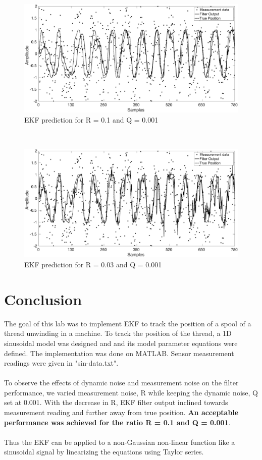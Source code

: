\documentclass[12pt]{article}
\begin{document}
\begin{figure}[ht!]
\centering
	\includegraphics[width = \textwidth]{./Figures/ratio2.eps}
	\caption{EKF prediction for R = 0.1 and Q = 0.001}
	\label{fig:EKF rat2}
\end{figure} 
\quad \\
\begin{figure}[hb!]
\centering
	\includegraphics[width = \textwidth]{./Figures/ratio3.eps}
	\caption{EKF prediction for R = 0.03 and Q = 0.001}
	\label{fig:EKF rat3}
\end{figure} \newpage

\newpage
\section{Conclusion}
The goal of this lab was to implement EKF to track the position of a spool of a thread unwinding in a machine. To track the position of the thread, a 1D sinusoidal model was designed and and its model parameter equations were defined. The implementation was done on MATLAB. Sensor measurement readings were given in "sin-data.txt". \\
\\
To observe the effects of dynamic noise and measurement noise on the filter performance, we varied measurement noise, R while keeping the dynamic noise, Q set at 0.001. With the decrease in R, EKF filter output inclined towards measurement reading and further away from true position.\textbf{ An acceptable performance was achieved for the ratio R = 0.1 and Q = 0.001}. \\
\\
Thus the EKF can be applied to a non-Gaussian non-linear function like a sinusoidal signal by linearizing the equations using Taylor series.
\end{document}
